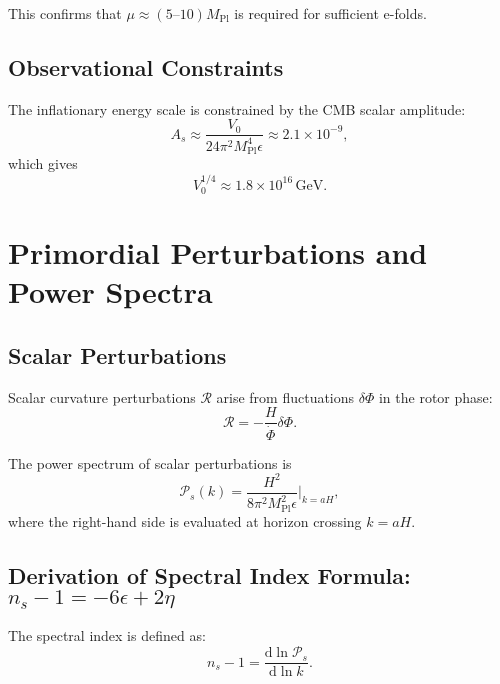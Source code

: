 \documentclass[11pt,a4paper]{article}
\numberwithin{equation}{section}
\theoremstyle{plain}
\theoremstyle{definition}
\theoremstyle{remark}
\newcommand{\dd}{\mathrm{d}}
\begin{document}
This confirms that $\mu \approx (5\text{--}10)M_{\mathrm{Pl}}$ is required for sufficient e-folds.

\subsection{Observational Constraints}

The inflationary energy scale is constrained by the CMB scalar amplitude:
\begin{equation}
A_s \approx \frac{V_0}{24\pi^2 M_{\mathrm{Pl}}^4\epsilon} \approx 2.1 \times 10^{-9},
\end{equation}
which gives
\begin{equation}
V_0^{1/4} \approx 1.8 \times 10^{16}\,\mathrm{GeV}.
\label{eq:V0-scale}
\end{equation}

\section{Primordial Perturbations and Power Spectra}
\label{sec:pert}

\subsection{Scalar Perturbations}

Scalar curvature perturbations $\mathcal{R}$ arise from fluctuations $\delta\Phi$ in the rotor phase:
\begin{equation}
\mathcal{R} = -\frac{H}{\dot{\Phi}}\delta\Phi.
\end{equation}

The power spectrum of scalar perturbations is
\begin{equation}
\mathcal{P}_s(k) = \frac{H^2}{8\pi^2 M_{\mathrm{Pl}}^2\epsilon}\Bigg|_{k=aH},
\label{eq:scalar-power}
\end{equation}
where the right-hand side is evaluated at horizon crossing $k = aH$.

\subsection{Derivation of Spectral Index Formula: $n_s - 1 = -6\epsilon + 2\eta$}

The spectral index is defined as:
\begin{equation}
n_s - 1 = \frac{\dd \ln \mathcal{P}_s}{\dd \ln k}.
\label{eq:ns-def}
\end{equation}
\end{document}
